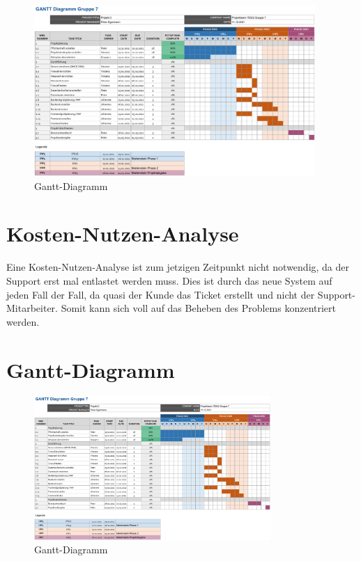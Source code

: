 \documentclass[a4paper,12pt,headings=small,ngerman,bibliography=totoc]{scrartcl}
\begin{document}
\begin{figure}[htbp]
  \centering
  \includegraphics[width=0.95\textwidth]{data/Gantt.png}
  \caption{Gantt-Diagramm}
  \label{fig:Gantt}
\end{figure}


\section{Kosten-Nutzen-Analyse}

Eine Kosten-Nutzen-Analyse ist zum jetzigen Zeitpunkt nicht notwendig, da der Support erst mal entlastet werden muss. Dies ist durch das neue System auf jeden Fall der Fall, da quasi der Kunde das Ticket erstellt und nicht der Support-Mitarbeiter. Somit kann sich voll auf das Beheben des Problems konzentriert werden.


\newpage

\appendix
{}


\section{Gantt-Diagramm}

\begin{figure}[h!]
  \centering
  \includegraphics[angle=90,origin=c,width=0.8\textwidth]{data/Gantt.png}
  \caption{Gantt-Diagramm}
  \label{app:Gantt}
\end{figure}
\end{document}

